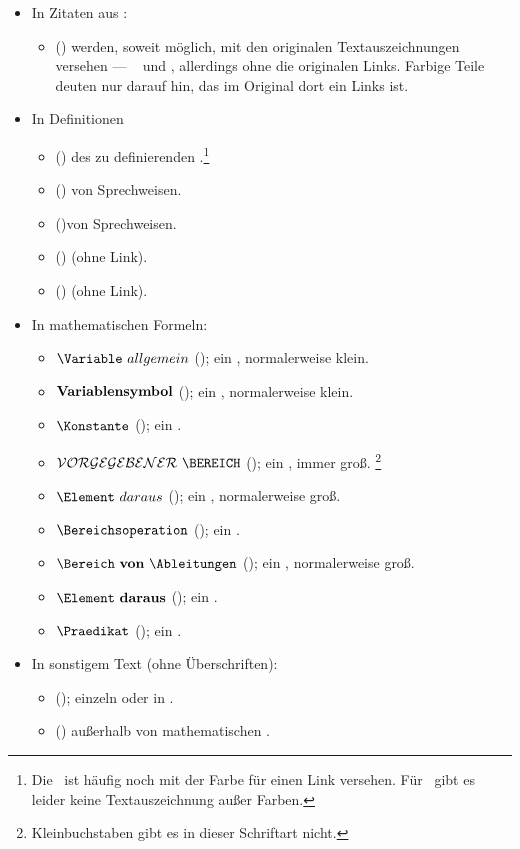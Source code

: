 \begin{itemize}
	\item In Zitaten aus \Wikipedia:
	\begin{itemize}
		\item {} (\WikiTyp) werden, soweit möglich, mit den originalen Textauszeichnungen versehen --- \textzB\ \likeWikiFt{\wikiBoldFt{\wikiBoldTyp}} und \likeWikiFt{\wikiItalicFt{\wikiItalicTyp}}, allerdings ohne die originalen Links.
		Farbige Teile deuten nur darauf hin, das im Original dort ein Links ist.
	\end{itemize}
	\item In Definitionen
	\begin{itemize}
		\item \DefFt{\Benennung} (\DefTyp) des zu definierenden \Begriffs.\footnote{%
			Die \Benennung\ ist häufig noch mit der Farbe für einen Link versehen.
			Für \Symbole\ gibt es leider keine Textauszeichnung außer Farben.
		}
		\item {} (\ManTyp) von Sprechweisen.
		\item {} (\OptTyp)von Sprechweisen.
		\item {} (\GloTyp) (ohne Link).
		\item {} (\gloTyp) (ohne Link).
	\end{itemize}
	\item In mathematischen Formeln:
	\begin{itemize}
		\item $\Varft       {\Variable\ allgemein}$ (\VarTyp); ein \Textbuchstabe, normalerweise klein.
		\item $\mathbf{Variablensymbol}$ (\varTyp); ein \Textbuchstabe, normalerweise klein.
		\item $\Conft                 {\Konstante}$ (\ConTyp); ein \Textwort.
		\item $\Setft     {VORGEGEBENER\ \BEREICH}$ (\SetTyp); ein \Textbuchstabe, immer groß.%
			\footnote{Kleinbuchstaben gibt es in dieser Schriftart nicht.}
		\item $\Elmft           {\Element\ daraus}$ (\ElmTyp); ein \Textbuchstabe, normalerweise groß.
		\item $\BOpft         {\Bereichsoperation}$ (\BOpTyp); ein \Textwort.
		\item $\Drvft{\Bereich\ von\ \Ableitungen}$ (\DrvTyp); ein \Textbuchstabe, normalerweise groß.
		\item $\drvft           {\Element\ daraus}$ (\drvTyp); ein \Textbuchstabe.
		\item $\Preft                 {\Praedikat}$ (\PreTyp); ein \Textwort.
	\end{itemize}
	\item In sonstigem Text (ohne Überschriften):
	\begin{itemize}
		\item    {} (\CharTyp); einzeln oder in \Zeichenketten.
		\item \likePreFt{\Praedikat} (\PreTyp) außerhalb von mathematischen \Formeln.
	\end{itemize}
\end{itemize}

